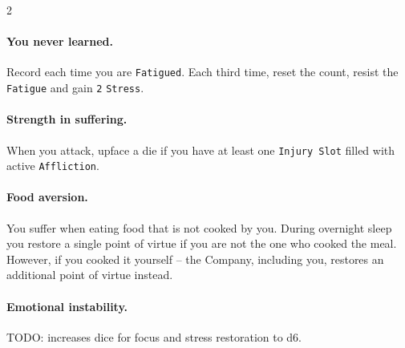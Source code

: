 \begin{multicols*}{2}
\paragraph{You never learned.} Record each time you are \texttt{Fatigued}. Each third time, reset the count, resist the \texttt{Fatigue} and gain \texttt{2} \texttt{Stress}.

\paragraph{Strength in suffering.} When you attack, upface a die if you have at least one \texttt{Injury Slot} filled with active \texttt{Affliction}.

\paragraph{Food aversion.} You suffer when eating food that is not cooked by you. 
During overnight sleep you restore a single point of virtue if you are not the one who cooked the meal.
However, if you cooked it yourself -- the Company, including you, restores an additional point of virtue instead.

\paragraph{Emotional instability.} TODO: increases dice for focus and stress restoration to d6.


\end{multicols*}
